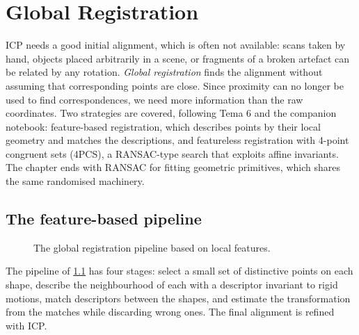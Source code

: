 \chapter{Global Registration}\label{ch:global}

ICP needs a good initial alignment, which is often not available: scans taken by hand, objects
placed arbitrarily in a scene, or fragments of a broken artefact can be related by any rotation.
\emph{Global registration} finds the alignment without assuming that corresponding points are
close. Since proximity can no longer be used to find correspondences, we need more information
than the raw coordinates. Two strategies are covered, following Tema 6 and the companion notebook:
feature-based registration, which describes points by their local geometry and matches the
descriptions, and featureless registration with 4-point congruent sets (4PCS), a RANSAC-type
search that exploits affine invariants. The chapter ends with RANSAC for fitting geometric
primitives, which shares the same randomised machinery.

\section{The feature-based pipeline}

\begin{figure}[tbp]
\centering
{}
\caption{The global registration pipeline based on local features.}
\label{fig:gr-pipeline}
\end{figure}

The pipeline of \cref{fig:gr-pipeline} has four stages: select a small set of distinctive points
on each shape, describe the neighbourhood of each with a descriptor invariant to rigid motions,
match descriptors between the shapes, and estimate the transformation from the matches while
discarding wrong ones. The final alignment is refined with ICP.

